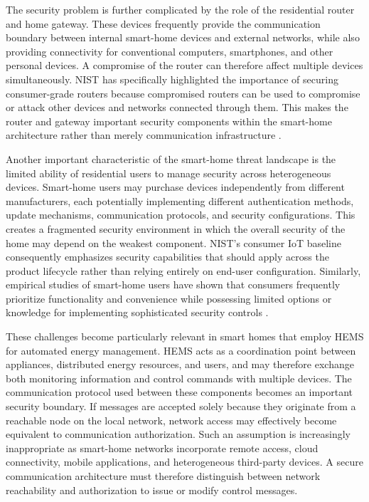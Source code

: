 The security problem is further complicated by the role of the residential router and home gateway. These devices frequently provide the communication boundary between internal smart-home devices and external networks, while also providing connectivity for conventional computers, smartphones, and other personal devices. A compromise of the router can therefore affect multiple devices simultaneously. NIST has specifically highlighted the importance of securing consumer-grade routers because compromised routers can be used to compromise or attack other devices and networks connected through them. This makes the router and gateway important security components within the smart-home architecture rather than merely communication infrastructure \citep{megasRecommendedCybersecurityRequirements2024}.

Another important characteristic of the smart-home threat landscape is the limited ability of residential users to manage security across heterogeneous devices. Smart-home users may purchase devices independently from different manufacturers, each potentially implementing different authentication methods, update mechanisms, communication protocols, and security configurations. This creates a fragmented security environment in which the overall security of the home may depend on the weakest component. NIST's consumer IoT baseline consequently emphasizes security capabilities that should apply across the product lifecycle rather than relying entirely on end-user configuration. Similarly, empirical studies of smart-home users have shown that consumers frequently prioritize functionality and convenience while possessing limited options or knowledge for implementing sophisticated security controls \citep{faganProfileIoTCore2022,haneySmartHomeSecurity2020}.

These challenges become particularly relevant in smart homes that employ HEMS for automated energy management. HEMS acts as a coordination point between appliances, distributed energy resources, and users, and may therefore exchange both monitoring information and control commands with multiple devices. The communication protocol used between these components becomes an important security boundary. If messages are accepted solely because they originate from a reachable node on the local network, network access may effectively become equivalent to communication authorization. Such an assumption is increasingly inappropriate as smart-home networks incorporate remote access, cloud connectivity, mobile applications, and heterogeneous third-party devices. A secure communication architecture must therefore distinguish between network reachability and authorization to issue or modify control messages.

